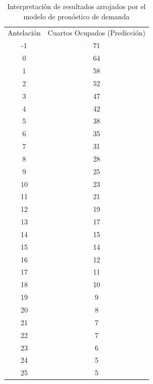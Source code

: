 \begin{table}[H]
\centering
\begin{tabular}{cc}
Antelación & Cuartos Ocupados (Predicción) \\
-1         & 71                            \\
0          & 64                            \\
1          & 58                            \\
2          & 52                            \\
3          & 47                            \\
4          & 42                            \\
5          & 38                            \\
6          & 35                            \\
7          & 31                            \\
8          & 28                            \\
9          & 25                            \\
10         & 23                            \\
11         & 21                            \\
12         & 19                            \\
13         & 17                            \\
14         & 15                            \\
15         & 14                            \\
16         & 12                            \\
17         & 11                            \\
18         & 10                            \\
19         & 9                             \\
20         & 8                             \\
21         & 7                             \\
22         & 7                             \\
23         & 6                             \\
24         & 5                             \\
25         & 5                            
\end{tabular}
\caption{Interpretación de resultados arrojados por el modelo de pronóstico de demanda}
\end{table}

